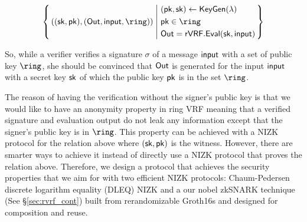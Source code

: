 $$ \Setst{ ((\sk, \pk),(\Out, \msg, \ring))}{
    \eprint{
        (\pk,\sk) \leftarrow \rVRF.\KeyGen(\secparam), \quad %
        \pk \in \ring, \quad
        \Out = \rVRF.\Eval(\sk,\msg)
    }{
        \begin{aligned}
        & (\pk,\sk) \leftarrow \KeyGen(\secparam) \\
        & \pk \in \ring \\
        & \Out = \rVRF.\Eval(\sk,\msg)
        \end{aligned}
    }
} $$

So, while a verifier verifies a signature $ \sigma $ of a message $ \mathsf{input} $ with a set of public key $ \ring $, she should be convinced that $ {\mathsf{Out}} $ is generated for the input $ \mathsf{input} $ with a secret key $ \mathsf{sk} $ of which the  public key $ \mathsf{pk} $ is in the set  $ \ring $. 

The reason of having the verification without the signer's public key is that we would like to have an anonymity property in ring VRF meaning that a verified signature and evaluation output do not leak any information except that the signer's public key is in $ \ring $.
This property can be achieved with a NIZK protocol for the relation above where $ (\mathsf{sk},\mathsf{pk}) $ is the witness. However, there are smarter ways to achieve it instead of directly use a NIZK protocol that proves the relation above. Therefore, we design a protocol that achieves the security properties that we aim for with two efficient NIZK protocols: Chaum-Pedersen discrete logarithm equality (DLEQ) NIZK and  a our nobel zkSNARK technique (See \S\ref{sec:rvrf_cont}) built from
rerandomizable Groth16s \cite{Groth16} and designed for composition and reuse.




